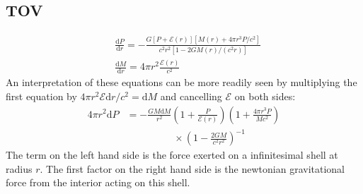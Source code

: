 \documentclass[twocolumn]{article}
\begin{document}
\begin{large}

\section*{TOV}
\begin{equation}
    \begin{split}
        &\frac{\text{d}P}{\text{d}r} = -\frac{G\left[P+\mathcal{E}(r)\right]\left[M(r)+4\pi r^3P/c^2\right]}{c^2r^2[1-2GM(r)/(c^2r)]} \\ 
        &\frac{\text{d}M}{\text{d}r} = 4\pi r^2\frac{\mathcal{E}(r)}{c^2}
    \end{split}
\end{equation}
An interpretation of these equations can be more readily seen by multiplying the first equation by $4\pi r^2\mathcal{E}\text{d}r/c^2 = \text{d}M$ and cancelling $\mathcal{E}$ on both sides:
\begin{equation}
    \begin{split}
        4\pi r^2\text{d}P &= -\frac{GM\text{d}M}{r^2}\left(1+\frac{P}{\mathcal{E}(r)}\right)\left(1+\frac{4\pi r^3P}{Mc^2}\right) \\ 
        &\hspace{2cm}\times\left(1-\frac{2GM}{c^2r^2}\right)^{-1}
    \end{split}
\end{equation}
The term on the left hand side is the force exerted on a infinitesimal shell at radius $r$. The first factor on the right hand side is the newtonian gravitational force from the interior acting on this shell.


\end{large}
\end{document}

